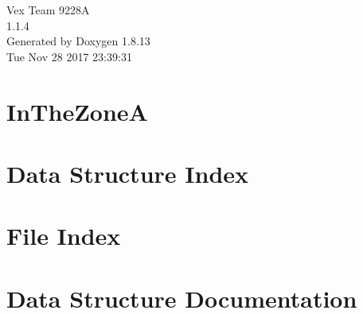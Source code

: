 \documentclass[twoside]{article}
\newcommand{\+}{\discretionary{\mbox{\scriptsize$\hookleftarrow$}}{}{}}
\begin{document}
\begin{titlepage}
\vspace*{7cm}
\begin{center}%
{\Large Vex Team 9228A \\[1ex]\large 1.\+1.\+4 }\\
\vspace*{1cm}
{\large Generated by Doxygen 1.8.13}\\
\vspace*{0.5cm}
{\small Tue Nov 28 2017 23:39:31}\\
\end{center}
\end{titlepage}
\tableofcontents
{}

\section{In\+The\+ZoneA}
\label{md__r_e_a_d_m_e}

\section{Data Structure Index}

\section{File Index}

\section{Data Structure Documentation}








\end{document}
